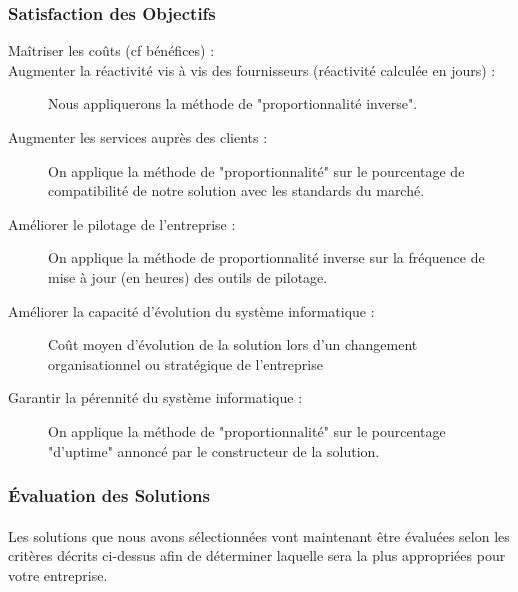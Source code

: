 \subsubsection{Satisfaction des Objectifs}

\begin{description}
\item[Maîtriser les coûts (cf bénéfices) :]
\item[Augmenter la réactivité vis à vis des fournisseurs (réactivité calculée en jours) :] Nous appliquerons la méthode de "proportionnalité inverse".
\item[Augmenter les services auprès des clients :] On applique la méthode de "proportionnalité" sur le pourcentage de compatibilité de notre solution avec les standards du marché. 
\item[Améliorer le pilotage de l'entreprise :] On applique la méthode de proportionnalité inverse sur la fréquence de mise à jour (en heures) des outils de pilotage.
\item[Améliorer la capacité d'évolution du système informatique :] Coût moyen d'évolution de la solution lors d'un changement organisationnel ou stratégique de l'entreprise
\item[Garantir la pérennité du système informatique :] On applique la méthode de "proportionnalité" sur le pourcentage "d'uptime" annoncé par le constructeur de la solution.
\end{description}


\subsubsection{Évaluation des Solutions}

\paragraph{} Les solutions que nous avons sélectionnées vont maintenant être évaluées selon les critères décrits ci-dessus afin de déterminer laquelle sera la plus appropriées pour votre entreprise.